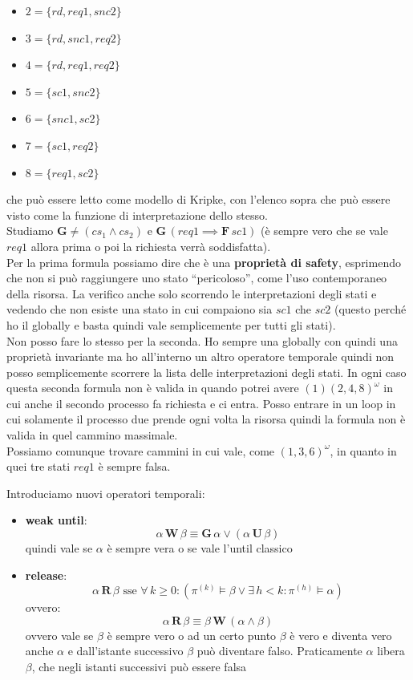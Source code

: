 \documentclass[a4paper,12pt, oneside]{book}
\begin{document}
\begin{esempio}
\begin{itemize}
    \item $2=\{rd,req1,snc2\}$
    \item $3=\{rd,snc1,req2\}$
    \item $4=\{rd,req1,req2\}$
    \item $5=\{sc1, snc2\}$
    \item $6=\{snc1,sc2\}$
    \item $7=\{sc1, req 2\}$
    \item $8=\{req1,sc2\}$
  \end{itemize}
  che può essere letto come modello di Kripke, con l'elenco sopra che può
  essere visto come la funzione di interpretazione dello stesso.\\
  Studiamo $\mathbf{G}\neq (cs_1\land cs_2)$ e $\mathbf{G}\,(req1\implies
  \mathbf{F}\,sc1)$ (è sempre vero che se vale $req1$ allora prima o poi la
  richiesta verrà soddisfatta).\\
  Per la prima formula possiamo dire che è una \textbf{proprietà di safety},
  esprimendo che non si può raggiungere uno stato ``pericoloso'', come l'uso
  contemporaneo della risorsa. La verifico anche solo scorrendo le
  interpretazioni degli stati e vedendo che non esiste una stato in cui
  compaiono sia $sc1$ che $sc2$ (questo perché ho il globally e basta quindi
  vale semplicemente per tutti gli stati). \\
  Non posso fare lo stesso per la seconda. Ho sempre una globally con quindi
  una proprietà invariante ma ho all'interno un altro operatore temporale
  quindi non posso semplicemente scorrere la lista delle interpretazioni degli
  stati. In ogni caso questa seconda formula non è valida in quando potrei
  avere $(1)(2,4,8)^\omega$ in cui anche il secondo processo fa richiesta e ci
  entra. Posso entrare in un loop in cui solamente il processo
  due prende ogni volta la risorsa quindi la formula non è valida in quel
  cammino massimale.\\
  Possiamo comunque trovare cammini in cui vale, come $(1,3,6)^\omega$, in
  quanto in quei tre stati $req1$ è sempre falsa.
\end{esempio}
Introduciamo nuovi operatori temporali:
\begin{itemize}
  \item \textbf{weak until}:
  \[\alpha\,\mathbf{W}\,\beta\equiv \mathbf{G}\,\alpha\lor
    (\alpha\,\mathbf{U}\,\beta)\]
  quindi vale se $\alpha$ è sempre vera o se vale l'until classico
  \item \textbf{release}:
  \[\alpha\,\mathbf{R}\,\beta\mbox{ sse }\forall\,k\geq 0:(\pi^{(k)}\vDash
    \beta\lor \exists\, h<k:\pi^{(h)}\vDash \alpha)\]
  ovvero:
  \[\alpha\,\mathbf{R}\,\beta\equiv \beta\,\mathbf{W}\,(\alpha\land \beta)\]
  ovvero vale se $\beta$ è sempre vero o ad un certo punto $\beta$ è vero e
  diventa vero anche $\alpha$ e dall'istante successivo $\beta$ può diventare
  falso. Praticamente $\alpha$ libera $\beta$, che negli istanti successivi può
  essere falsa
\end{itemize}
\end{document}
